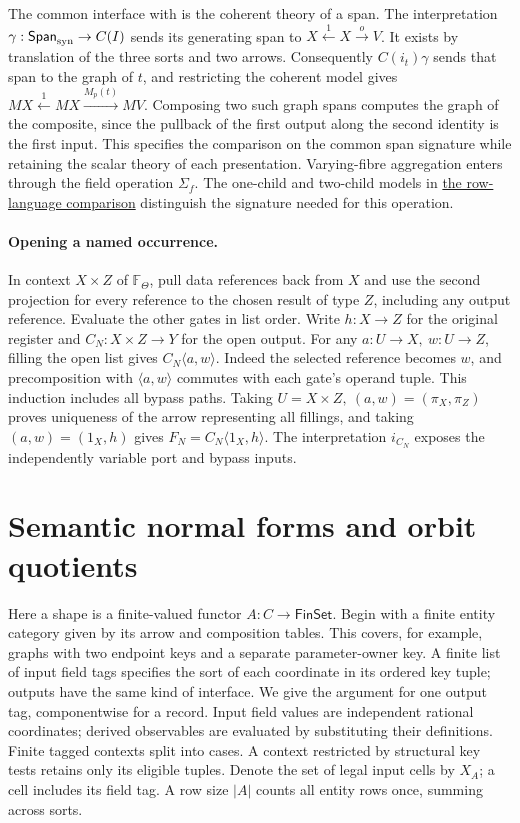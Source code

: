\documentclass[11pt,a4paper]{article}
\theoremstyle{definition}
\theoremstyle{remark}\newaliascnt{remark}{theorem}
\numberwithin{equation}{section}
\begin{document}
The common interface with \cite[Definition 4.9 and Theorem 4.13]{pugh} is the coherent theory of a span. The interpretation \(\gamma:\mathsf{Span}_{\rm syn}\to C(I)\) sends its generating span to \(X\xleftarrow{1}X\xrightarrow{o}V\). It exists by translation of the three sorts and two arrows. Consequently \(C(i_t)\gamma\) sends that span to the graph of \(t\), and restricting the coherent model gives \(MX\xleftarrow{1}MX\xrightarrow{M_p(t)}MV\). Composing two such graph spans computes the graph of the composite, since the pullback of the first output along the second identity is the first input. This specifies the comparison on the common span signature while retaining the scalar theory of each presentation. Varying-fibre aggregation enters through the field operation \(\Sigma_f\). The one-child and two-child models in \hyperref[sec:coherent-row-language]{the row-language comparison} distinguish the signature needed for this operation.

\paragraph{Opening a named occurrence.}\label{sec:cut-substitution}
In context \(X\times Z\) of \(\mathbb F_\Theta\), pull data references back from \(X\) and use the second projection for every reference to the chosen result of type \(Z\), including any output reference. Evaluate the other gates in list order. Write \(h:X\to Z\) for the original register and \(C_N:X\times Z\to Y\) for the open output. For any \(a:U\to X,\ w:U\to Z\), filling the open list gives \(C_N\langle a,w\rangle\). Indeed the selected reference becomes \(w\), and precomposition with \(\langle a,w\rangle\) commutes with each gate's operand tuple. This induction includes all bypass paths. Taking \(U=X\times Z,\ (a,w)=(\pi_X,\pi_Z)\) proves uniqueness of the arrow representing all fillings, and taking \((a,w)=(1_X,h)\) gives \(F_N=C_N\langle1_X,h\rangle\). The interpretation \(i_{C_N}\) exposes the independently variable port and bypass inputs.

\section{Semantic normal forms and orbit quotients}\label{sec:semantic}
Here a shape is a finite-valued functor $A:C\to\mathsf{FinSet}$. Begin with a finite entity category given by its arrow and composition tables. This covers, for example, graphs with two endpoint keys and a separate parameter-owner key. A finite list of input field tags specifies the sort of each coordinate in its ordered key tuple; outputs have the same kind of interface. We give the argument for one output tag, componentwise for a record. Input field values are independent rational coordinates; derived observables are evaluated by substituting their definitions. Finite tagged contexts split into cases. A context restricted by structural key tests retains only its eligible tuples. Denote the set of legal input cells by $X_A$; a cell includes its field tag. A row size $|A|$ counts all entity rows once, summing across sorts.
\end{document}
